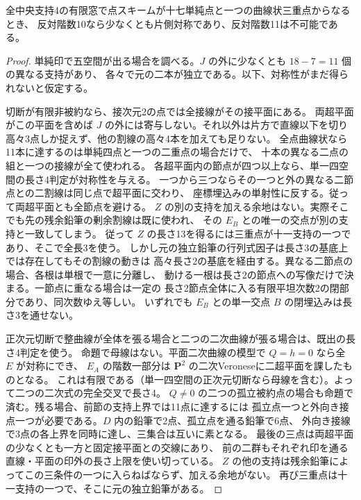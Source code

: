 \begin{theorem}\label{thm:finite-single-triple-five-space}
全中央支持4の有限窓で点スキームが十七単純点と一つの曲線状三重点からなるとき、
反対階数10なら少なくとも片側対称であり、反対階数11は不可能である。
\end{theorem}
\begin{proof}
単純印で五空間が出る場合を調べる。$J$ の外に少なくとも $18-7=11$ 個の異なる支持があり、
各々で元の二本が独立である。以下、対称性がまだ得られないと仮定する。

切断が有限非被約なら、接次元2の点では全接線がその接平面にある。
両超平面がこの平面を含めば $J$ の外には寄与しない。それ以外は片方で直線以下を切り
高々3点しか捉えず、他の割線の高々4本を加えても足りない。
全点曲線状なら11本に達するのは単純四点と一つの二重点の場合だけで、
十本の異なる二点の組と一つの接線が全て使われる。
各超平面内の節点が四つ以上なら、単一四空間の長さ4判定が対称性を与える。
一つから三つならその一つと外の異なる二節点との二割線は同じ点で超平面に交わり、
座標埋込みの単射性に反する。従って両超平面とも全節点を避ける。
$Z$ の別の支持を加える余地はない。実際そこでも先の残余鉛筆の剰余割線は既に使われ、
その $E_B$ との唯一の交点が別の支持と一致してしまう。
従って $Z$ の長さ13を得るには三重点が十一支持の一つであり、そこで全長3を使う。
しかし元の独立鉛筆の行列式因子は長さ3の基底上では存在してもその割線の動きは
高々長さ2の基底を経由する。異なる二節点の場合、各根は単根で一意に分離し、
動ける一根は長さ2の節点への写像だけで決まる。一節点に重なる場合は一定の
長さ2節点全体に入る有限平坦次数2の閉部分であり、同次数ゆえ等しい。
いずれでも $E_B$ との単一交点 $B$ の閉埋込みは長さ3を通せない。

正次元切断で整曲線が全体を張る場合と二つの二次曲線が張る場合は、既出の長さ4判定を使う。
命題で母線はない。平面二次曲線の模型で $Q=h=0$ なら全 $E$ が対称にでき、
$E_A$ の階数一部分は $\mathbf P^2$ の二次Veroneseに二超平面を課したものとなる。
これは有限である（単一四空間の正次元切断なら母線を含む）。よって二つの二次式の完全交叉で長さ4。
$Q\ne0$ の二つの孤立被約点の場合も命題で済む。残る場合、前節の支持上界では11点に達するには
孤立点一つと外向き接点一つが必要である。$D$ 内の鉛筆で2点、孤立点を通る鉛筆で6点、
外向き接線で3点の各上界を同時に達し、三集合は互いに素となる。
最後の三点は両超平面の少なくとも一方と固定接平面との交線にあり、
前の二群もそれぞれ印を通る直線・平面の印外の長さ上限を使い切っている。
$Z$ の他の支持は残余鉛筆によってこの三条件の一つに入らねばならず、加える余地がない。
再び三重点は十一支持の一つで、そこに元の独立鉛筆がある。


\end{proof}
